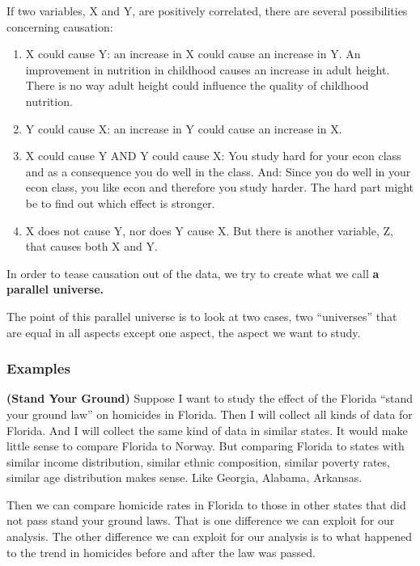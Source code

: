 \documentclass[
]{book}
\providecommand{\tightlist}{%
  \setlength{\itemsep}{0pt}\setlength{\parskip}{0pt}}
\begin{document}
If two variables, X and Y, are positively correlated, there are several possibilities concerning causation:

\begin{enumerate}
\def\labelenumi{\arabic{enumi}.}
\tightlist
\item
  X could cause Y: an increase in X could cause an increase in Y. An improvement in nutrition in childhood causes an increase in adult height. There is no way adult height could influence the quality of childhood nutrition.
\item
  Y could cause X: an increase in Y could cause an increase in X.
\item
  X could cause Y AND Y could cause X: You study hard for your econ class and as a consequence you do well in the class. And: Since you do well in your econ class, you like econ and therefore you study harder. The hard part might be to find out which effect is stronger.
\item
  X does not cause Y, nor does Y cause X. But there is another variable, Z, that causes both X and Y.
\end{enumerate}

In order to tease causation out of the data, we try to create what we call \textbf{a parallel universe.}

The point of this parallel universe is to look at two cases, two ``universes'' that are equal in all aspects except one aspect, the aspect we want to study.

\hypertarget{examples-1}{%
\subsubsection{Examples}\label{examples-1}}

\textbf{(Stand Your Ground)} Suppose I want to study the effect of the Florida ``stand your ground law'' on homicides in Florida. Then I will collect all kinds of data for Florida. And I will collect the same kind of data in similar states. It would make little sense to compare Florida to Norway. But comparing Florida to states with similar income distribution, similar ethnic composition, similar poverty rates, similar age distribution makes sense. Like Georgia, Alabama, Arkansas.

Then we can compare homicide rates in Florida to those in other states that did not pass stand your ground laws. That is one difference we can exploit for our analysis. The other difference we can exploit for our analysis is to what happened to the trend in homicides before and after the law was passed.
\end{document}
